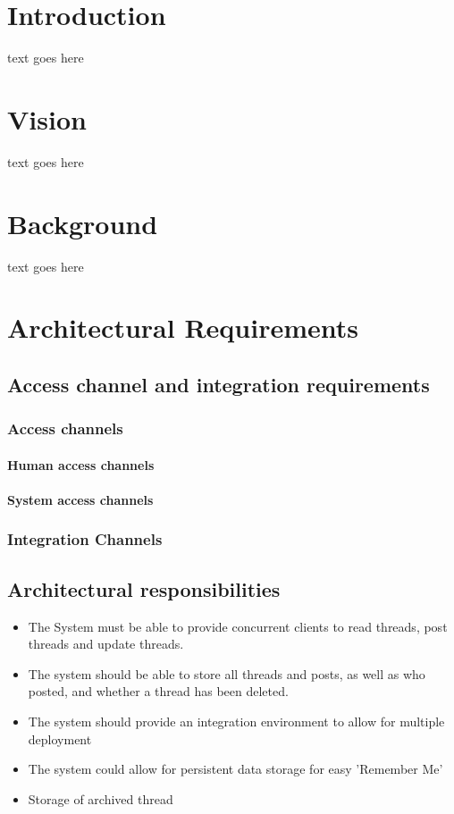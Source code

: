 \documentclass[10pt]{article}
\begin{document}

\newpage
\tableofcontents
\newpage
\listoffigures
\newpage

\section{Introduction}
text goes here

\section{Vision}
text goes here

\section{Background}
text goes here

\section{Architectural Requirements}
\subsection{Access channel and integration requirements} 
\subsubsection{Access channels}
\paragraph{Human access channels}
\paragraph{System access channels}
\subsubsection{Integration Channels}
\clearpage

\subsection{Architectural responsibilities}  %
\begin{itemize}
	\item The System must be able to provide concurrent clients to read threads, post threads and update threads.
	\item The system should be able to store all threads and posts, as well as who posted, and whether a thread has been deleted.
	\item The system should provide an integration environment to allow for multiple deployment
	\item The system could allow for persistent data storage for easy 'Remember Me'
	\item Storage of archived thread
	
\end{itemize}
\clearpage
\end{document}
